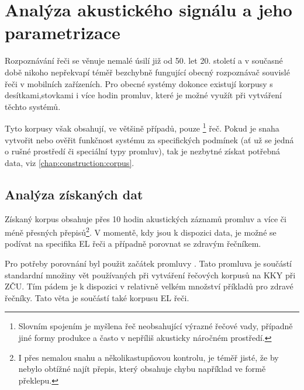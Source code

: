 \section{Analýza akustického signálu a jeho parametrizace}
\label{chap:construction:analysis}

Rozpoznávání řeči se věnuje nemalé úsilí již od 50. let 20. století a v současné době nikoho nepřekvapí téměř bezchybně fungující obecný rozpoznávač souvislé řeči v mobilních zařízeních. Pro obecné systémy dokonce existují korpusy s desítkami,stovkami i více hodin promluv, které je možné využít při vytváření těchto systémů.

Tyto korpusy však obsahují, ve většině případů, pouze \footnote{Slovním spojením  je myšlena řeč neobsahující výrazné řečové vady, případně jiné formy produkce a často v nepříliš akusticky náročném prostředí.} řeč. Pokud je snaha vytvořit nebo ověřit funkčnost systému za specifických podmínek (ať už se jedná o rušné prostředí či speciální typy promluv), tak je nezbytné získat potřebná data, viz \ref{chap:construction:corpus}.

\subsection{Analýza získaných dat}
\label{chap:construction:analysis:data}

Získaný korpus obsahuje přes 10 hodin akustických záznamů promluv a více či méně přesných přepisů\footnote{I přes nemalou snahu a několikastupňovou kontrolu, je téměř jisté, že by nebylo obtížné najít přepis, který obsahuje chybu například ve formě překlepu.}. V momentě, kdy jsou k dispozici data, je možné se podívat na specifika EL řeči a případně porovnat se zdravým řečníkem.

Pro potřeby porovnání byl použit začátek promluvy \textit{}. Tato promluva je součástí standardní množiny vět používaných při vytváření řečových korpusů na KKY při ZČU. Tím pádem je k dispozici v relativně velkém množství příkladů pro zdravé řečníky. Tato věta je součástí také korpusu EL řeči.

